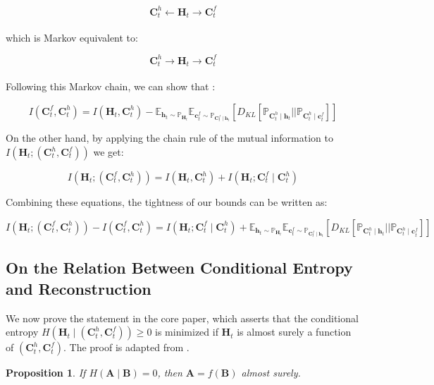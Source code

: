 \documentclass{article}
\theoremstyle{plain}
\newtheorem{proposition}[theorem]{Proposition}
\theoremstyle{definition}
\theoremstyle{remark}
\begin{document}
\[
\mathbf{C}_t^h \xleftarrow[]{} \mathbf{H}_t \xrightarrow[]{} \mathbf{C}_t^f
\]

which is Markov equivalent to:

\[
\mathbf{C}_t^h \xrightarrow{} \mathbf{H}_t \xrightarrow[]{} \mathbf{C}_t^f
\]

Following this Markov chain, we can show that \cite{shwartz2024compress}:

\[
I(\mathbf{C}_t^f, \mathbf{C}_t^h) = I(\mathbf{H}_t, \mathbf{C}_t^h) - \mathbb{E}_{\mathbf{h}_t \sim \mathbb{P}_{\mathbf{H}_t}} \mathbb{E}_{\mathbf{c}_{t}^f \sim \mathbb{P}_{\mathbf{C}_{t}^f \mid \mathbf{h}_t}} \left[ D_{KL}[\mathbb{P}_{\mathbf{C}_{t}^h \mid \mathbf{h}_t} || \mathbb{P}_{\mathbf{C}_{t}^h \mid \mathbf{c}_{t}^f }] \right]
\]

On the other hand, by applying the chain rule of the mutual information to $I(\mathbf{H}_{t}; (\mathbf{C}_t^h, \mathbf{C}_t^f))$ we get:

\[
I(\mathbf{H}_{t}; (\mathbf{C}_t^f, \mathbf{C}_t^h)) = I(\mathbf{H}_t, \mathbf{C}_t^h) + I(\mathbf{H}_t; \mathbf{C}_t^f \mid \mathbf{C}_t^h) 
\]

Combining these equations, the tightness of our bounds can be written as:

\[
I(\mathbf{H}_{t}; (\mathbf{C}_t^f, \mathbf{C}_t^h)) - I(\mathbf{C}_t^f, \mathbf{C}_t^h) = I(\mathbf{H}_t; \mathbf{C}_t^f \mid \mathbf{C}_t^h) + \mathbb{E}_{\mathbf{h}_t \sim \mathbb{P}_{\mathbf{H}_t}} \mathbb{E}_{\mathbf{c}_{t}^f \sim \mathbb{P}_{\mathbf{C}_{t}^f \mid \mathbf{h}_t}} \left[ D_{KL}[\mathbb{P}_{\mathbf{C}_{t}^h \mid \mathbf{h}_t} || \mathbb{P}_{\mathbf{C}_{t}^h \mid \mathbf{c}_{t}^f }] \right]
\]

\subsection{On the Relation Between Conditional Entropy and Reconstruction}
\label{appendix: zero_cond_H}

We now prove the statement in the core paper, which asserts that the conditional entropy \( H(\mathbf{H}_{t} \mid (\mathbf{C}_t^h, \mathbf{C}_t^f)) \geq 0 \) is minimized if \( \mathbf{H}_{t} \) is almost surely a function of \( (\mathbf{C}_t^h, \mathbf{C}_t^f) \). The proof is adapted from \cite{cover1999elementsInfo}.

\begin{proposition}
\label{prop: zero_cond_H}
If \( H(\mathbf{A} \mid \mathbf{B}) = 0 \), then \( \mathbf{A} = f(\mathbf{B}) \) almost surely.
\end{proposition}
\end{document}
